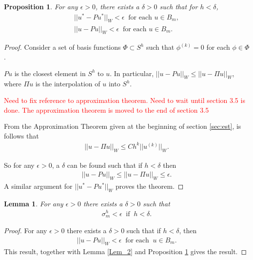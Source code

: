 \documentclass[../../main.tex]{subfiles}
\begin{document}
\newtheorem{Prop_5}[Prop_1]{Proposition} 
\begin{Prop_5}
	\label{Prop_5}
	For any $\epsilon > 0$, there exists a $\delta >0$ such that for $h<\delta$,
	\begin{eqnarray*}
	||u^{*} - Pu^{*}||_{W} < \epsilon \ \textrm{ for each } u \in B_{m},\\
	||u - Pu||_{W} < \epsilon \ \textrm{ for each } u \in B_{m}.
	\end{eqnarray*}
\end{Prop_5}
\begin{proof}
	Consider a set of basis functions $\Phi \subset S^h$ such that $\phi^(k) = 0$ for each $\phi \in \Phi$.

	$Pu$ is the closest element in $S^h$ to $u$. In particular, $||u-Pu||_{W}\leq ||u-\Pi u||_{W}$, where $\Pi u$ is the interpolation of $u$ into $S^h$.
	
	\textcolor{red}{Need to fix reference to approximation theorem. Need to wait until section 3.5 is done. The approximation theorem is moved to the end of section 3.5}

	From the Approximation Theorem given at the beginning of section \ref{sec:est}, is follows that
	\begin{eqnarray*}
		||u - \Pi u||_{W} \leq Ch^{k}||u^{(k)}||_{W}.
	\end{eqnarray*}

	So for any $\epsilon > 0$, a $\delta$ can be found such that if $h<\delta$ then
	\begin{eqnarray*}
		||u - Pu||_{W} \leq ||u - \Pi u||_{W} \leq \epsilon.
	\end{eqnarray*}
	A similar argument for $||u^{*} - Pu^{*}||_{W}$ proves the theorem.
\end{proof}


\newtheorem{Lem_3}[Lem_1]{Lemma} 
\begin{Lem_3}
	\label{Lem_3}
	For any $\epsilon >0$ there exists a $\delta > 0$ such that
	\begin{eqnarray}
	\sigma_{m}^{h} < \epsilon \ \textrm{ if } \ h < \delta. \label{eq:lem3}
	\end{eqnarray}
\end{Lem_3}
\begin{proof}
	For any $\epsilon > 0$ there exists a $\delta > 0$ such that if $h<\delta$, then
	\begin{eqnarray*}
	||u-Pu||_{W} < \epsilon \ \textrm{ for each } \ u \in B_{m}.
	\end{eqnarray*}
	This result, together with Lemma \ref{Lem_2} and Proposition \ref{Prop_5} gives the result.
\end{proof}
\end{document}
